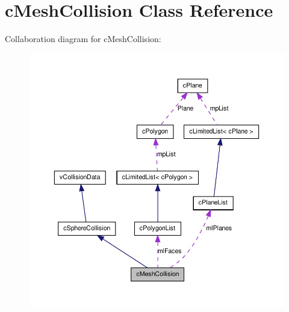 \hypertarget{classc_mesh_collision}{
\section{cMeshCollision Class Reference}
\label{classc_mesh_collision}
}


Collaboration diagram for cMeshCollision:\nopagebreak
\begin{figure}[H]
\begin{center}
\leavevmode
\includegraphics[width=400pt]{classc_mesh_collision__coll__graph}
\end{center}
\end{figure}
